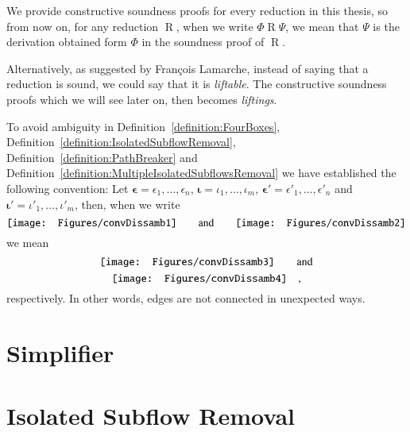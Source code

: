 \begin{convention}
We provide constructive soundness proofs for every reduction in this thesis, so from now on, for any reduction $\mathrel{R}$, when we write $\Phi\mathrel{R}\Psi$, we mean that $\Psi$ is the derivation obtained form $\Phi$ in the soundness proof of $\mathrel{R}$.
\end{convention}


\begin{remark}\label{remark:lifting}
Alternatively, as suggested by Fran\c{c}ois Lamarche, instead of saying that a reduction is sound, we could say that it is \emph{liftable}. The constructive soundness proofs which we will see later on, then becomes \emph{liftings}.
\end{remark}

\begin{convention}
To avoid ambiguity in Definition~\vref{definition:FourBoxes}, Definition~\vref{definition:IsolatedSubflowRemoval}, Definition~\vref{definition:PathBreaker} and Definition~\vref{definition:MultipleIsolatedSubflowsRemoval} we have established the following convention:
Let $\boldsymbol\epsilon=\epsilon_1,\dots,\epsilon_n$, $\boldsymbol\iota=\iota_1,\dots,\iota_m$, $\boldsymbol{\epsilon'}=\epsilon'_1,\dots,\epsilon'_n$ and $\boldsymbol{\iota'}=\iota'_1,\dots,\iota'_m$, then, when we write
\[
\vcenter{\hbox{\texttt{[image: Figures/convDissamb1]}}}
\qquad\mbox{and}\qquad
\vcenter{\hbox{\texttt{[image: Figures/convDissamb2]}}}
\]
we mean
\[
\vcenter{\hbox{\texttt{[image: Figures/convDissamb3]}}}
\qquad\mbox{and}
\]
\[
\vcenter{\hbox{\texttt{[image: Figures/convDissamb4]}}}
\quad,
\]
respectively. In other words, edges are not connected in unexpected ways.
\end{convention}

\section{Simplifier}\label{section:Simplifier}



\section{Isolated Subflow Removal}\label{section:IsolatedSubflowRemoval}

